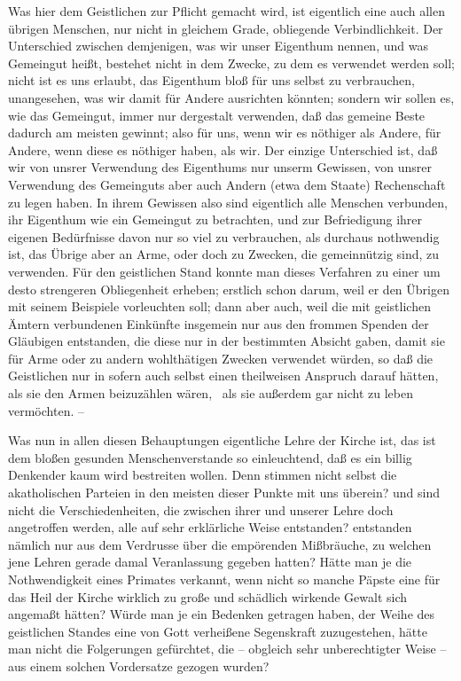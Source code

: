 {Was hier dem Geistlichen zur Pflicht gemacht wird, ist eigentlich eine auch allen übrigen Menschen, nur nicht in gleichem Grade, obliegende Verbindlichkeit. Der Unterschied zwischen demjenigen, was wir unser Eigenthum nennen, und was Gemeingut heißt, bestehet nicht in dem Zwecke, zu dem es verwendet werden soll; nicht ist es uns erlaubt, das Eigenthum bloß für uns selbst zu verbrauchen, unangesehen, was wir damit für Andere ausrichten könnten; sondern wir sollen es, wie das Gemeingut, immer nur dergestalt verwenden, daß das gemeine Beste dadurch am meisten gewinnt; also für uns, wenn wir es nöthiger als Andere, für Andere, wenn diese es nöthiger haben, als wir. Der einzige Unterschied ist, daß wir von unsrer Verwendung des Eigenthums nur unserm Gewissen, von unsrer Verwendung des Gemeinguts aber auch Andern (etwa dem Staate) Rechenschaft zu legen haben. In ihrem Gewissen also sind eigentlich alle Menschen verbunden, ihr Eigenthum wie ein Gemeingut zu betrachten, und zur Befriedigung ihrer eigenen Bedürfnisse davon nur so viel zu verbrauchen, als durchaus nothwendig ist, das Übrige aber an Arme, oder doch zu Zwecken, die gemeinnützig sind, zu verwenden. Für den geistlichen Stand konnte man dieses Verfahren zu einer um desto strengeren Obliegenheit erheben; erstlich schon darum, weil er den Übrigen mit seinem Beispiele vorleuchten  soll; dann aber auch, weil die mit geistlichen Ämtern verbundenen Einkünfte insgemein nur aus den frommen Spenden der Gläubigen entstanden, die diese nur in der bestimmten Absicht gaben, damit sie für Arme oder zu andern wohlthätigen Zwecken verwendet würden, so daß die Geistlichen nur in sofern auch selbst einen theilweisen Anspruch darauf hätten, als sie den Armen beizuzählen wären, \dh\  als sie außerdem gar nicht zu leben vermöchten.} --\par
Was nun in allen diesen Behauptungen eigentliche Lehre der Kirche ist, das ist dem bloßen gesunden Menschenverstande so einleuchtend, daß es ein billig Denkender kaum wird bestreiten wollen. Denn stimmen nicht selbst die akatholischen Parteien in den meisten dieser Punkte mit uns überein? und sind nicht die Verschiedenheiten, die zwischen ihrer und unserer Lehre doch angetroffen werden, alle auf sehr erklärliche Weise entstanden? entstanden nämlich nur aus dem Verdrusse über die empörenden Mißbräuche, zu welchen jene Lehren gerade damal Veranlassung gegeben hatten? Hätte man je die Nothwendigkeit eines Primates verkannt, wenn nicht so manche Päpste eine für das Heil der Kirche wirklich zu große und schädlich wirkende Gewalt sich angemaßt hätten? Würde man je ein Bedenken getragen haben, der Weihe des geistlichen Standes eine von Gott verheißene Segenskraft zuzugestehen, hätte man nicht die Folgerungen gefürchtet, die -- obgleich sehr unberechtigter Weise -- aus einem solchen Vordersatze gezogen wurden? \par
